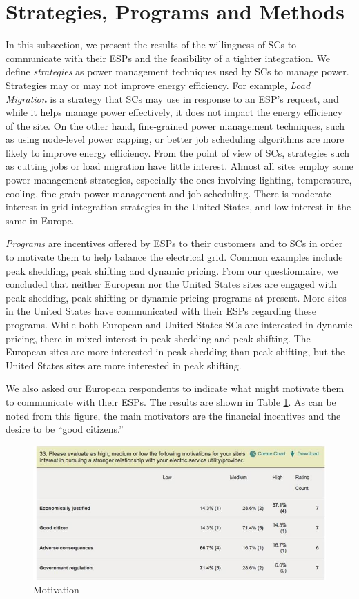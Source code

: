 \documentclass{article}
\begin{document}
\section{Strategies, Programs and Methods}
\label{spm}
In this subsection, we present the results of the willingness of SCs to communicate with their ESPs and the feasibility of a tighter integration. We define \emph{strategies} as power management techniques used by SCs to manage power. Strategies may or may not improve energy efficiency. For example, \emph{Load Migration} is a strategy that SCs may use in response to an ESP's request, and while it helps manage power effectively, it does not impact the energy efficiency of the site. On the other hand, fine-grained power management techniques, such as using node-level power capping, or better job scheduling algorithms are more likely to improve energy efficiency. From the point of view of SCs, strategies such as cutting jobs or load migration have little interest. Almost all sites employ some power management strategies, especially the ones involving lighting, temperature, cooling, fine-grain power management and job scheduling. There is moderate interest in grid integration strategies in the United States, and low interest in the same in Europe. 

\emph{Programs} are incentives offered by ESPs to their customers and to SCs in order to motivate them to help balance the electrical grid. Common examples include peak shedding, peak shifting and dynamic pricing. From our questionnaire, we concluded that neither European nor the United States sites are engaged with peak shedding, peak shifting or dynamic pricing programs at present. More sites in the United States have communicated with their ESPs regarding these programs. While both European and United States SCs are interested in dynamic pricing, there in mixed interest in peak shedding and peak shifting. The European sites are more interested in peak shedding than peak shifting, but the United States sites are more interested in peak shifting. 

We also asked our European respondents to indicate what might motivate them to communicate with their ESPs. The results are shown in Table \ref{fig:table2}. As can be noted from this figure, the main motivators are the financial incentives and the desire to be ``good citizens.''

\begin{figure}
\begin{center}
\includegraphics[scale=0.5]{figs/Table2.jpg}
\caption{Motivation}
\label{fig:table2}
\end{center}
\end{figure}
\end{document}
